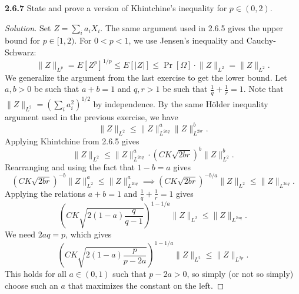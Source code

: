 \documentclass[11pt,letterpaper]{report}
\newcommand{\Lp}[2]{\big\|{#1}\big\|_{L^{#2}}}
\newenvironment{solution}
{\begin{proof}[Solution]}
{\end{proof}}
\begin{document}
\noindent\textbf{2.6.7}
State and prove a version of Khintchine's inequality for $p\in (0, 2)$.
\begin{solution}
	Set $Z = \sum_i a_iX_i$. The same argument used in 2.6.5 gives the upper bound for $p\in [1, 2)$. For $0<p<1$, we use Jensen's inequality and Cauchy-Schwarz:
	\[
	\Lp{Z}{p} = E[Z^p]^{1/p}\leq E[|Z|]\leq \Pr[\Omega]\cdot \Lp{Z}{2} = \Lp{Z}{2}.
	\]
	We generalize the argument from the last exercise to get the lower bound. Let $a,b>0$ be such that $a+b = 1$ and $q,r > 1$ be such that $\frac{1}{q} + \frac{1}{r} = 1$. Note that $\Lp{Z}{2} = (\sum_i a_i^2)^{1/2}$ by independence. By the same H\"older inequality argument used in the previous exercise, we have
	\[
	\Lp{Z}{2} \leq \Lp{Z}{2aq}^a\Lp{Z}{2br}^b.
	\]
	Applying Khintchine from 2.6.5 gives
	\[
	\Lp{Z}{2} \leq \Lp{Z}{2aq}^a\cdot \left(CK\sqrt{2br}\right)^b\Lp{Z}{2}^b.
	\]
	Rearranging and using the fact that $1-b = a$ gives
	\[
	\left(CK\sqrt{2br}\right)^{-b}\Lp{Z}{2}^a\leq \Lp{Z}{2aq}^a\implies \left(CK\sqrt{2br}\right)^{-b/a}\Lp{Z}{2}\leq \Lp{Z}{2aq}.
	\]
	Applying the relations $a+b= 1$ and $\frac{1}{q} + \frac{1}{r}= 1$ gives
	\[
	\left(CK\sqrt{2(1-a)\frac{q}{q-1}}\right)^{1-1/a}\Lp{Z}{2} \leq \Lp{Z}{2aq}.
	\]
	We need $2aq = p$, which gives
	\[	
	\left(CK\sqrt{2(1-a)\frac{p}{p-2a}}\right)^{1-1/a}\Lp{Z}{2} \leq \Lp{Z}{2p}.
	\]
	This holds for all $a\in (0,1)$ such that $p-2a>0$, so simply (or not so simply) choose such an $a$ that maximizes the constant on the left.
\end{solution}
\end{document}
